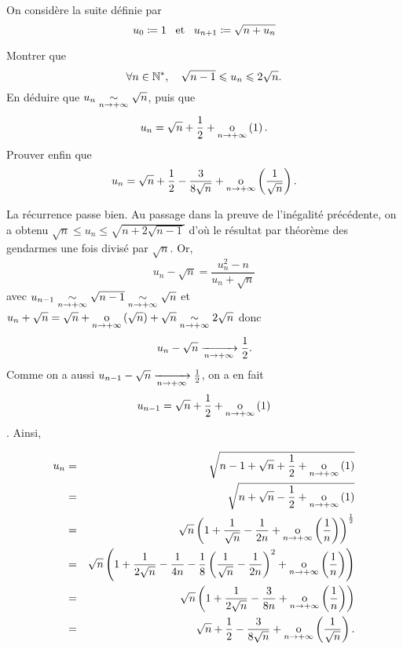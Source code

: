 \documentclass{magnolia}
\begin{document}
On considère la suite définie par
\[u_0\coloneqq 1 \quad\!\text{et}\quad\! u_{n+1}\coloneqq \sqrt{n+u_n}\]
\begin{questions}
\question Montrer que
 \[\forall n\in{\mathbb{N}^*} ,\quad \sqrt{n-1}\leqslant u_n\leqslant 2\sqrt{n}.\]
\question En déduire que $u_n\underset{n\rightarrow +\infty}{\sim}\sqrt{n}$, puis que
  \[u_n=\sqrt{n}+\frac{1}{2}+\underset{n \rightarrow +\infty}{\text{o}}\left(1\right).\]
\question Prouver enfin que \[u_n=\sqrt{n}+\frac{1}{2}-\frac{3}{8\sqrt{n}}
  + \underset{n \rightarrow +\infty}{\text{o}}\left(\frac{1}{\sqrt{n}}\right).\]
\end{questions}

\begin{sol}
\begin{questions}
\question La récurrence passe bien.
\question Au passage dans la preuve de l'inégalité précédente, on a obtenu $\sqrt{n}\leq u_n\leq \sqrt{n+2\sqrt{n-1}}$ d'où le résultat par théorème des gendarmes une fois divisé par $\sqrt{n}$.
Or,
$$u_n-\sqrt{n}=\frac{u_n^2-n}{u_n+\sqrt{n}}$$ avec $u_{n-1}\underset{n\rightarrow +\infty}{\sim}\sqrt{n-1}\underset{n\rightarrow +\infty}{\sim}\sqrt{n}$ et $u_n+\sqrt{n}=\sqrt{n}+\underset{n \rightarrow +\infty}{\text{o}}\left(\sqrt{n}\right)+\sqrt{n}\underset{n\rightarrow +\infty}{\sim}2\sqrt{n}$ donc $$u_n-\sqrt{n}\xrightarrow[n\rightarrow +\infty]{}\frac{1}{2}.$$
\question Comme on a aussi $u_{n-1}-\sqrt{n}\xrightarrow[n\rightarrow +\infty]{}\frac{1}{2}$, on a en fait $$u_{n-1}=\sqrt{n}+\frac{1}{2}+\underset{n \rightarrow +\infty}{\text{o}}\left(1\right)$$. Ainsi,

\begin{eqnarray*}
u_n&=&\sqrt{n-1+\sqrt{n}+\frac{1}{2}+\underset{n \rightarrow +\infty}{\text{o}}\left(1\right)}\\
&=&\sqrt{n+\sqrt{n}-\frac{1}{2}+\underset{n \rightarrow +\infty}{\text{o}}\left(1\right)}\\
&=&\sqrt{n}\left(1+\frac{1}{\sqrt{n}}-\frac{1}{2n}+\underset{n \rightarrow +\infty}{\text{o}}\left(\frac{1}{n}\right)\right)^{\frac{1}{2}}\\
&=&\sqrt{n}\left(1+\frac{1}{2\sqrt{n}}-\frac{1}{4n}-\frac{1}{8}\left(\frac{1}{\sqrt{n}}-\frac{1}{2n}\right)^2+\underset{n \rightarrow +\infty}{\text{o}}\left(\frac{1}{n}\right)\right)\\
&=&\sqrt{n}\left(1+\frac{1}{2\sqrt{n}}-\frac{3}{8n}+\underset{n \rightarrow +\infty}{\text{o}}\left(\frac{1}{n}\right)\right)\\
&=&\sqrt{n}+\frac{1}{2}-\frac{3}{8\sqrt{n}}
  + \underset{n \rightarrow +\infty}{\text{o}}\left(\frac{1}{\sqrt{n}}\right).
\end{eqnarray*}

\end{questions}
\end{sol}
\end{document}
